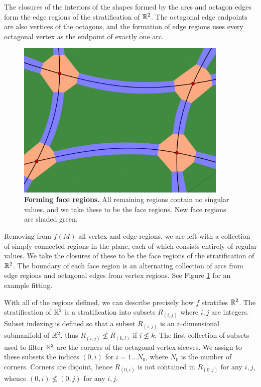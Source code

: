 The closures of the interiors of the shapes formed by the arcs and octagon edges form the edge regions of the stratification of $\mathbb{R}^2$.
The octagonal edge endpoints are also vertices of the octagons, and the formation of edge regions uses every octagonal vertex as the endpoint of exactly one arc.

\begin{figure}[h!]
	\centering
	\includegraphics[width=0.9\textwidth]{figures/face-sleeve.png}
	\caption{
		\textbf{Forming face regions.}
		All remaining regions contain no singular values, and we take these to be the face regions.
		New face regions are shaded green.
	}
	\label{fig:face-sleeve}
\end{figure}

Removing from $f(M)$ all vertex and edge regions, we are left with a collection of simply connected regions in the plane, each of which consists entirely of regular values.
We take the closures of these to be the face regions of the stratification of $\mathbb{R}^2$.
The boundary of each face region is an alternating collection of arcs from edge regions and octagonal edges from vertex regions.
See Figure \ref{fig:face-sleeve} for an example fitting.

With all of the regions defined, we can describe precisely how $f$ stratifies $\mathbb{R}^2$.
The stratification of $\mathbb{R}^2$ is a stratification into subsets $R_{(i,j)}$ where $i,j$ are integers.
Subset indexing is defined so that a subset $R_{(i,j)}$ is an $i$--dimensional submanifold of $\mathbb{R}^2$, thus $R_{(i,j)}\nleq R_{(k,l)}$ if $i\nleq k$.
The first collection of subsets used to filter $\mathbb{R}^2$ are the corners of the octagonal vertex sleeves.
We assign to these subsets the indices $(0,i)$ for $i=1\dots N_0$, where $N_0$ is the number of corners.
Corners are disjoint, hence $R_{(0,i)}$ is not contained in $R_{(0,j)}$ for any $i, j$, whence $(0,i)\nleq (0,j)$ for any $i,j$.

